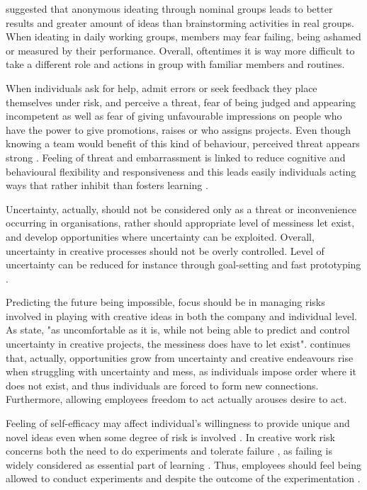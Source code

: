 \citep{sosik1998transformational} suggested that anonymous ideating through nominal groups leads to better results and greater amount of ideas than brainstorming activities in real groups. When ideating in daily working groups, members may fear failing, being ashamed or measured by their performance. Overall, oftentimes it is way more difficult to take a different role and actions in group with familiar members and routines. \citep{jung2001transformational}

When individuals ask for help, admit errors or seek feedback they place themselves under risk, and perceive a threat, fear of being judged and appearing incompetent as well as fear of giving unfavourable impressions on people who have the power to give promotions, raises or who assigns projects\citep{edmondson1999psychological,brown1990politeness}. Even though knowing a team would benefit of this kind of behaviour, perceived threat appears strong \citep{edmondson1999psychological}. Feeling of threat and embarrassment is linked to reduce cognitive and behavioural flexibility and responsiveness \citep{staw1989tradeoff} and this leads easily individuals acting ways that rather inhibit than fosters learning \citep{argyris1982reasoning}. 

Uncertainty, actually, should not be considered only as a threat or inconvenience occurring in organisations, rather should appropriate level of messiness let exist, and develop opportunities where uncertainty can be exploited. Overall, uncertainty in creative processes should not be overly controlled. \citep{sternberg1997creativity} Level of uncertainty can be reduced for instance through goal-setting and fast prototyping \citep{mumford2002leading}. 

Predicting the future being impossible, focus should be in managing risks involved in playing with creative ideas in both the company and individual level. As \citet{sternberg1997creativity} state, "as uncomfortable as it is, while not being able to predict and control uncertainty in creative projects, the messiness does have to let exist". \citet{kanter1983change}continues that, actually, opportunities grow from uncertainty and creative endeavours rise when struggling with uncertainty and mess, as individuals impose order where it does not exist, and thus individuals are forced to form new connections. Furthermore, allowing employees freedom to act actually arouses desire to act.

Feeling of self-efficacy may affect individual's willingness to provide unique and novel ideas even when some degree of risk is involved \citep{mumford1988creativity}. In creative work risk concerns both the need to do experiments and tolerate failure \citep{andriopoulos2000enhancing,quinn1985managing}, as failing is widely considered as essential part of learning \citep{farson2002failuretolerantleader}. Thus, employees should feel being allowed to conduct experiments and despite the outcome of the experimentation \citep{jung2003role}.

